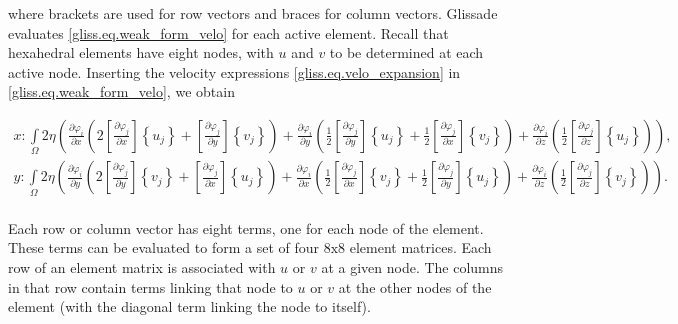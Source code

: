 \noindent
where brackets are used for row vectors and braces for column vectors.
Glissade evaluates \eqref{gliss.eq.weak_form_velo} for each active element.  Recall that hexahedral elements have eight nodes,
with $u$ and $v$ to be determined at each active node.
Inserting the velocity expressions \eqref{gliss.eq.velo_expansion} in \eqref{gliss.eq.weak_form_velo}, we obtain

\begin{equation}
  \label{gliss.eq.element_matrix}
  \begin{split}
    x: \int\limits_{\Omega }{2\eta \left( \frac{\partial {{\varphi }_{i}}}{\partial x}\left( 2\left[ \frac{\partial {{\varphi }_{j}}}{\partial x} \right]\left\{ {{u}_{j}} \right\}+\left[ \frac{\partial {{\varphi }_{j}}}{\partial y} \right]\left\{ {{v}_{j}} \right\} \right)+\frac{\partial {{\varphi }_{i}}}{\partial y}\left( \frac{1}{2}\left[ \frac{\partial {{\varphi }_{j}}}{\partial y} \right]\left\{ {{u}_{j}} \right\}+\frac{1}{2}\left[ \frac{\partial {{\varphi }_{j}}}{\partial x} \right]\left\{ {{v}_{j}} \right\} \right)+\frac{\partial {{\varphi }_{i}}}{\partial z}\left( \frac{1}{2}\left[ \frac{\partial {{\varphi }_{j}}}{\partial z} \right]\left\{ {{u}_{j}} \right\} \right) \right)},  \\
    y: \int\limits_{\Omega }{2\eta \left( \frac{\partial {{\varphi }_{i}}}{\partial y}\left( 2\left[ \frac{\partial {{\varphi }_{j}}}{\partial y} \right]\left\{ {{v}_{j}} \right\}+\left[ \frac{\partial {{\varphi }_{j}}}{\partial x} \right]\left\{ {{u}_{j}} \right\} \right)+\frac{\partial {{\varphi }_{i}}}{\partial x}\left( \frac{1}{2}\left[ \frac{\partial {{\varphi }_{j}}}{\partial x} \right]\left\{ {{v}_{j}} \right\}+\frac{1}{2}\left[ \frac{\partial {{\varphi }_{j}}}{\partial y} \right]\left\{ {{u}_{j}} \right\} \right)+\frac{\partial {{\varphi }_{i}}}{\partial z}\left( \frac{1}{2}\left[ \frac{\partial {{\varphi }_{j}}}{\partial z} \right]\left\{ {{v}_{j}} \right\} \right) \right)}.  \\
  \end{split}
\end{equation}

\noindent
Each row or column vector has eight terms, one for each node of the element.
These terms can be evaluated to form a set of four $8\text{x}8$ element matrices.
Each row of an element matrix is associated with $u$ or $v$ at a given node.  The columns in that row contain terms
linking that node to $u$ or $v$ at the other nodes of the element (with the diagonal term linking the node to itself).  

